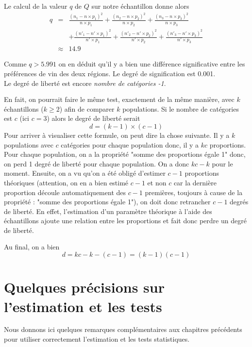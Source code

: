 \documentclass[12pt, a4paper]{book}
\numberwithin{equation}{section}
\begin{document}
Le calcul de la valeur $q$ de $Q$ sur notre échantillon donne alors
\begin{eqnarray*}
q & = & \frac{(n_1 - n\times p_1)^2}{n\times p_1} + \frac{(n_2 - n\times p_2)^2}{n\times p_2}
+ \frac{(n_3 - n\times p_3)^2}{n\times p_3} \\
  &    &  + \frac{(n'_1 - n'\times p_1)^2}{n'\times p_1} + \frac{(n'_2 - n'\times p_2)^2}{n'\times p_2}
+ \frac{(n'_3 - n'\times p_3)^2}{n'\times p_3}\\
  & \approx & 14.9
\end{eqnarray*}

Comme $q>5.991$ on en déduit qu'il y a bien une différence significative entre les préférences de vin
des deux régions. Le degré de signification est 0.001. \\

 Le degré de liberté est encore {\it nombre de catégories -1}. 

En fait, on pourrait
faire le même test, exactement de la même manière, avec $k$ échantillons ($k\geq 2$) afin de comparer $k$
populations. Si le nombre de catégories est $c$ (ici $c=3$) alors le degré de liberté serait 
$$
d = (k-1)\times (c-1)
$$
Pour arriver à visualiser cette formule, on peut dire la chose suivante. Il y a $k$ populations avec $c$
catégories pour chaque population donc, il y a $kc$ proportions. Pour chaque population, on a 
la propriété "somme des 
proportions égale 1" donc, on perd 1 degré de liberté pour chaque population. On a donc $kc-k$ pour le 
moment. Ensuite, on a vu qu'on a été obligé d'estimer $c-1$ proportions théoriques (attention, on en a bien 
estimé $c-1$ et non $c$ car la dernière proportion découle automatiquement des $c-1$ premières, toujours à 
cause de la propriété : "somme des proportions égale 1"), on doit donc retrancher $c-1$ degrés de liberté. 
En effet, l'estimation d'un paramètre théorique à l'aide des échantillons ajoute une relation entre les proportions et fait donc perdre un degré de liberté.
 
Au final, on a bien 
$$
d=kc - k - (c-1) = (k-1)(c-1)
$$

\appendix

\chapter{Quelques précisions sur l'estimation et les tests}

Nous donnons ici quelques remarques complémentaires aux chapitres précédents pour utiliser correctement
l'estimation et les tests statistiques.
\end{document}
